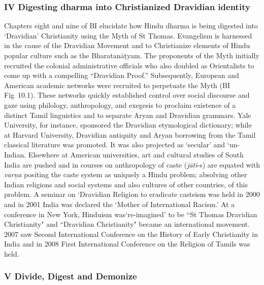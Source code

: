 \subsubsection*{IV Digesting dharma into Christianized Dravidian identity}

Chapters eight and nine of BI elucidate how Hindu dharma is being digested into ‘Dravidian’ Christianity using the Myth of St Thomas. Evangelism is harnessed in the cause of the Dravidian Movement and to Christianize elements of Hindu popular culture such as the Bharatanāṭyam. The proponents of the Myth initially recruited the colonial administrative officials who also doubled as Orientalists to come up with a compelling “Dravidian Proof.” Subsequently, European and American academic networks were recruited to perpetuate the Myth (BI Fig~10.1). These networks quickly established control over social discourse and gaze using philology, anthropology, and exegesis to proclaim existence of a distinct Tamil linguistics and to separate Aryan and Dravidian grammars. Yale University, for instance, sponsored the Dravidian etymological dictionary; while at Harvard University, Dravidian antiquity and Aryan borrowing from the Tamil classical literature was promoted. It was also projected as ‘secular’ and ‘un-Indian. Elsewhere at American universities, art and cultural studies of South India are pushed and in courses on anthropology of caste (\textit{jāti}-s) are equated with \textit{varņa} positing the caste system as uniquely a Hindu problem; absolving other Indian religions and social systems and also cultures of other countries, of this problem. A seminar on ‘Dravidian Religion to eradicate casteism was held in 2000 and in 2001 India was declared the ‘Mother of International Racism.’ At a conference in New York, Hinduism was‘re-imagined’ to be ``St Thomas Dravidian Christianity" and ``Dravidian Christianity" became an international movement. 2007 saw Second International Conference on the History of Early Christianity in India and in 2008 First International Conference on the Religion of Tamils was held.

\newpage


\subsubsection*{V Divide, Digest and Demonize}

\vskip -6pt

